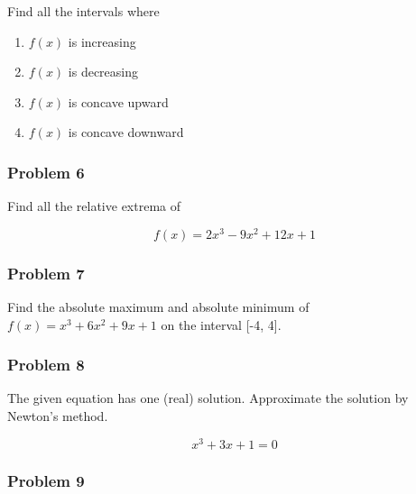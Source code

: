 \documentclass[
  letterpaper,
  DIV=11,
  numbers=noendperiod]{scrartcl}
\providecommand{\tightlist}{%
  \setlength{\itemsep}{0pt}\setlength{\parskip}{0pt}}\usepackage{longtable,booktabs,array}
\begin{document}
Find all the intervals where

\begin{enumerate}
\def\labelenumi{\alph{enumi}.}
\tightlist
\item
  \(f(x)\) is increasing
\item
  \(f(x)\) is decreasing
\item
  \(f(x)\) is concave upward
\item
  \(f(x)\) is concave downward
\end{enumerate}

\thispagestyle{empty}

\newpage{}

\subsubsection{Problem 6}\label{problem-6}

Find all the relative extrema of

\[
f(x) = 2x^3 - 9x^2 + 12x + 1
\]

\hfill\break
\hfill\break
\hfill\break
\hfill\break
\hfill\break
\hfill\break
\hfill\break
\hfill\break
\hfill\break
\hfill\break
\hfill\break
\hfill\break
\hfill\break
\hfill\break
\hfill\break
\hfill\break
\hfill\break
\hfill\break
\hfill\break
\hfill\break
\thispagestyle{empty}

\subsubsection{Problem 7}\label{problem-7}

Find the absolute maximum and absolute minimum of
\(f(x) = x^3 + 6x^2 +9x +1\) on the interval {[}-4, 4{]}.

\thispagestyle{empty}

\newpage{}

\subsubsection{Problem 8}\label{problem-8}

The given equation has one (real) solution. Approximate the solution by
Newton's method.

\[x^3 + 3x + 1 = 0\]

\thispagestyle{empty}

\newpage{}

\subsubsection{Problem 9}\label{problem-9}
\end{document}
